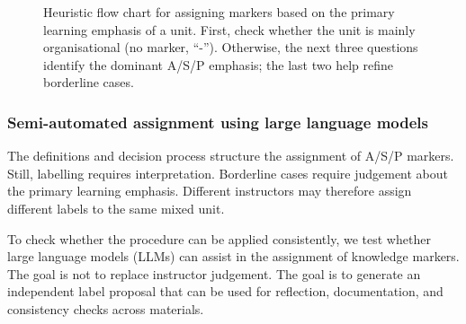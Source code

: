 \documentclass{article}
\begin{document}
\begin{figure}[hbt!]
  \caption{Heuristic flow chart for assigning markers based on the primary learning emphasis of a unit. First, check whether the unit is mainly organisational (no marker, ``-''). Otherwise, the next three questions identify the dominant A/S/P emphasis; the last two help refine borderline cases.}
  \label{fig:asp-decision-tree}
\end{figure}

\subsubsection{Semi-automated assignment using large language models}
\label{sec:llm-assignment}

The definitions and decision process structure the assignment of A/S/P markers. Still, labelling requires interpretation. Borderline cases require judgement about the primary learning emphasis. Different instructors may therefore assign different labels to the same mixed unit.

To check whether the procedure can be applied consistently, we test whether large language models (LLMs) can assist in the assignment of knowledge markers. The goal is not to replace instructor judgement. The goal is to generate an independent label proposal that can be used for reflection, documentation, and consistency checks across materials.
\end{document}
